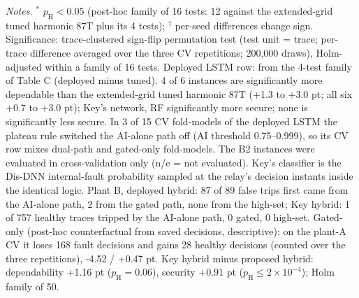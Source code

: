 \begin{table}[!htbp]
\vspace{3pt}\par\raggedright\scriptsize\textit{Notes.} $^{*}$ $p_{\mathrm{H}}<0.05$ (post-hoc family of 16 tests: 12 against the extended-grid tuned harmonic 87T plus its 4 tests); $^{\dagger}$ per-seed differences change sign. Significance: trace-clustered sign-flip permutation test (test unit = trace; per-trace difference averaged over the three CV repetitions; 200{,}000 draws), Holm-adjusted within a family of 16 tests. Deployed LSTM row: from the 4-test family of Table C (deployed minus tuned). 4 of 6 instances are significantly more dependable than the extended-grid tuned harmonic 87T (+1.3 to +3.0 pt; all six +0.7 to +3.0 pt); Key's network, RF significantly more secure; none is significantly less secure. In 3 of 15 CV fold-models of the deployed LSTM the plateau rule switched the AI-alone path off (AI threshold 0.75--0.999), so its CV row mixes dual-path and gated-only fold-models. The B2 instances were evaluated in cross-validation only (n/e = not evaluated). Key's classifier is the Dis-DNN internal-fault probability sampled at the relay's decision instants inside the identical logic. Plant B, deployed hybrid: 87 of 89 false trips first came from the AI-alone path, 2 from the gated path, none from the high-set; Key hybrid: 1 of 757 healthy traces tripped by the AI-alone path, 0 gated, 0 high-set. Gated-only (post-hoc counterfactual from saved decisions, descriptive): on the plant-A CV it loses 168 fault decisions and gains 28 healthy decisions (counted over the three repetitions), -4.52 / +0.47 pt. Key hybrid minus proposed hybrid: dependability +1.16 pt ($p_{\mathrm{H}}=0.06$), security +0.91 pt ($p_{\mathrm{H}}\le2\times10^{-4}$); Holm family of 50.
\end{table}